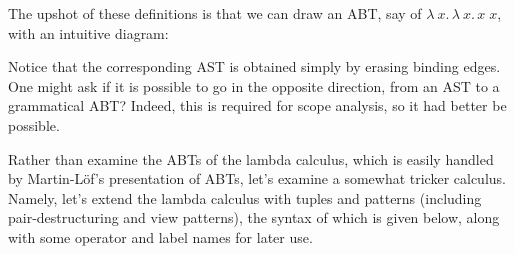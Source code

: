 \documentclass[11pt]{article} %
\theoremstyle{definition}
\newcommand{\fn}{\lambda\:\!}
\begin{document}
The upshot of these definitions is that we can draw an ABT, say of $\fn x.\,\fn x.\, x\;x$, with an intuitive diagram:
\newline
{}
\newline
Notice that the corresponding AST is obtained simply by erasing binding edges.
One might ask if it is possible to go in the opposite direction, from an AST to a grammatical ABT?
Indeed, this is required for scope analysis, so it had better be possible.


Rather than examine the ABTs of the lambda calculus, which is easily handled by Martin-L\"of's presentation of ABTs, let's examine a somewhat tricker calculus.
Namely, let's extend the lambda calculus with tuples and patterns (including pair-destructuring and view patterns), the syntax of which is given below, along with some operator and label names for later use.
\end{document}
